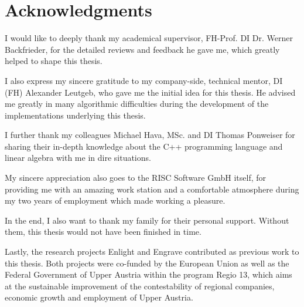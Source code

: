 
\chapter*{Acknowledgments}

I would like to deeply thank my academical supervisor, FH-Prof. DI Dr. Werner Backfrieder, for the detailed reviews and feedback he gave me, which greatly helped to shape this thesis.

I also express my sincere gratitude to my company-side, technical mentor, DI (FH) Alexander Leutgeb, who gave me the initial idea for this thesis.
He advised me greatly in many algorithmic difficulties during the development of the implementations underlying this thesis.

I further thank my colleagues Michael Hava, MSc. and DI Thomas Ponweiser for sharing their in-depth knowledge about the C++ programming language and linear algebra with me in dire situations.

My sincere appreciation also goes to the RISC Software GmbH itself, for providing me with an amazing work station and a comfortable atmosphere during my two years of employment which made working a pleasure.

In the end, I also want to thank my family for their personal support.
Without them, this thesis would not have been finished in time.

Lastly, the research projects Enlight and Engrave contributed as previous work to this thesis.
Both projects were co-funded by the European Union as well as the Federal Government of Upper Austria within the program Regio 13, which aims at the sustainable improvement of the contestability of regional companies, economic growth and employment of Upper Austria.

